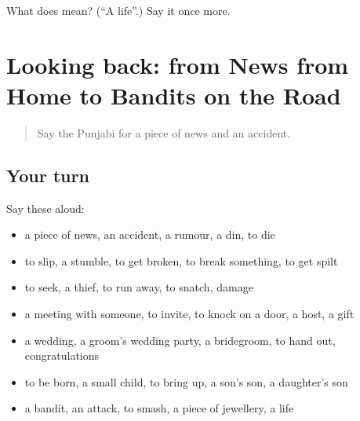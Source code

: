 \begin{tcolorbox}[breakable,colback=teal!4,colframe=teal!35!black,title={Before you move on}]
What does  mean? (\textquotedblleft{}A life\textquotedblright{}.) Say it once more.
\end{tcolorbox}
\section[(dialogue)]{Looking back: from News from Home to Bandits on the Road}

\label{lesson:PA-R315-review-309-315}



\begin{quote}
Say the Punjabi for a piece of news and an accident.
\end{quote}

\subsection*{Your turn}
Say these aloud:

\begin{itemize}
\raggedright
  \item a piece of news, an accident, a rumour, a din, to die
  \item to slip, a stumble, to get broken, to break something, to get spilt
  \item to seek, a thief, to run away, to snatch, damage
  \item a meeting with someone, to invite, to knock on a door, a host, a gift
  \item a wedding, a groom's wedding party, a bridegroom, to hand out, congratulations
  \item to be born, a small child, to bring up, a son's son, a daughter's son
  \item a bandit, an attack, to smash, a piece of jewellery, a life
\end{itemize}

